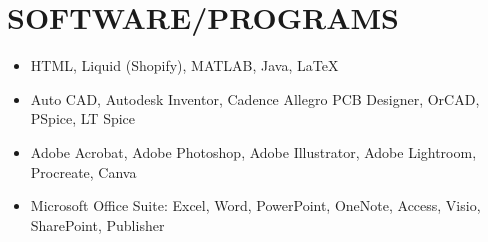 \documentclass[AutoFakeBold]{resume}
\begin{document}
\section{\makebox[.75em][c]{\faCode} \textbf{SOFTWARE/PROGRAMS}}
\noindent
\begin{minipage}[t]{.5\textwidth}
    \begin{itemize}
    \item HTML, Liquid (Shopify), MATLAB, Java, \LaTeX
    \end{itemize}
\end{minipage}
\begin{minipage}[t]{.5\textwidth}
    \begin{itemize}
    \item Auto CAD, Autodesk Inventor, Cadence Allegro PCB Designer, OrCAD, PSpice, LT Spice
    \vspace{5mm}
    \end{itemize}
\end{minipage}
\vspace{5mm}
\begin{minipage}[t]{.5\textwidth}
    \begin{itemize}
    \item Adobe Acrobat, Adobe Photoshop, Adobe Illustrator, Adobe Lightroom, Procreate, Canva
    \end{itemize}
\end{minipage}
\begin{minipage}[t]{.5\textwidth}
    \begin{itemize}
    \item Microsoft Office Suite: Excel, Word, PowerPoint, OneNote, Access, Visio, SharePoint, Publisher
    \end{itemize}
\end{minipage}

\end{document}
